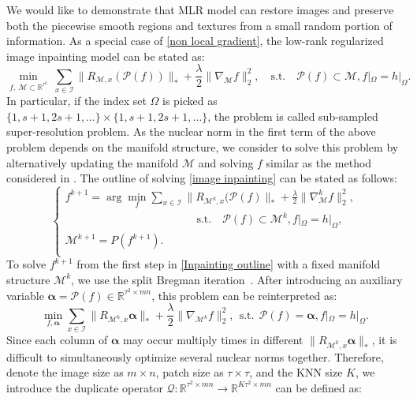 \documentclass[letterpaper,10pt]{article}
\newcommand{\R}{\mathbb{R}}
\begin{document}
We would like to demonstrate that MLR model can restore images and preserve both the piecewise smooth regions and textures from a small random portion of information. As a special case of \eqref{non local gradient}, the low-rank regularized image inpainting model can be stated as:
\begin{equation}\label{image inpainting}
\min_{f,~ \mathcal{M} \subset \R^{\tau^2}} ~\sum_{x \in \mathscr{I}} \|R_{\mathcal{M},x} (\mathcal{P}(f)) \|_* +\frac{\lambda}{2}\|\nabla_\mathcal{M} f\|_2^2, \quad \text{s.t.} \quad \mathcal{P}(f) \subset \mathcal{M}, f|_\Omega = h|_\Omega.
\end{equation}
In particular, if the index set $\Omega$ is picked as $\{1, s+1, 2s+1,\ldots\} \times \{1, s+1, 2s+1,\ldots\}$, the problem is called sub-sampled super-resolution problem. As the nuclear norm in the first term of the above problem depends on the manifold structure, we consider to solve this problem by alternatively updating the manifold $\mathcal{M}$ and solving $f$ similar as the method considered in \cite{osher2016low}. The outline of solving \eqref{image inpainting} can be stated as follows:
\begin{equation}\label{Inpainting outline}
\begin{cases}
f^{k+1} = \arg\min_{f} \sum_{x \in \mathscr{I}} \|R_{\mathcal{M}^k,x} (\mathcal{P}(f) \|_* +\frac{\lambda}{2}\|\nabla_\mathcal{M}^k f\|_2^2, \\
 \hspace{5cm} \text{s.t.}\quad  \mathcal{P}(f) \subset \mathcal{M}^k, f|_\Omega = h|_\Omega,\\
\mathcal{M}^{k+1} = {P}(f^{k+1}).\\
\end{cases}
\end{equation}
To solve $f^{k+1}$ from the first step in \eqref{Inpainting outline} with a fixed manifold structure $\mathcal{M}^k$, we use the split Bregman iteration~\cite{goldstein2009split}. After introducing an auxiliary variable $\bm{\alpha} = \mathcal{P}(f) \in  \R^{\tau^2 \times mn} $, this problem can be reinterpreted as:
\begin{equation}\label{image inpainting inner ini}
\min_{f,\bm{\alpha}} \sum_{x \in \mathscr{I}} \|R_{\mathcal{M}^k,x} \bm{\alpha} \|_* +\frac{\lambda}{2}\|\nabla_{\mathcal{M}^k} f\|_2^2, ~~ \text{s.t.} ~~ \mathcal{P} (f)  = \bm{\alpha},f|_\Omega = h|_\Omega.
\end{equation}
Since each column of $\bm{\alpha}$ may occur multiply times in different $ \|R_{\mathcal{M}^k,x}\bm{\alpha} \|_*$, it is difficult to simultaneously optimize several nuclear norms together. Therefore, denote the image size as $m \times n$, patch size as $\tau \times \tau$, and the KNN size $K$, we introduce the duplicate operator $\mathcal{Q}: \R^{\tau^2 \times mn}  \rightarrow \R^{K \tau^2 \times mn}$ can be defined as:
\end{document}
